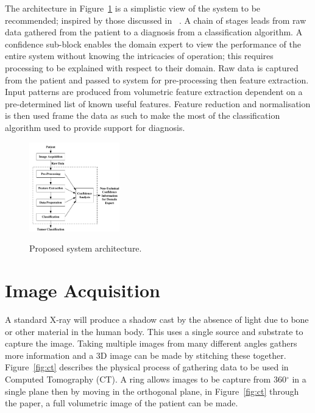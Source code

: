 \documentclass[journal]{IEEEtran}
\begin{document}
The architecture in Figure~\ref{fig:Proposed} is a simplistic view of the system to be recommended; inspired by those discussed in ~\cite{ahmed2011efficacy,kumar2011classification,sachdeva2011multiclass}.
A chain of stages leads from raw data gathered from the patient to a diagnosis from a classification algorithm.
A confidence sub-block enables the domain expert to view the performance of the entire system without knowing the intricacies of operation; this requires processing to be explained with respect to their domain.
Raw data is captured from the patient and passed to system for pre-processing then feature extraction.
Input patterns are produced from volumetric feature extraction dependent on a pre-determined list of known useful features. 
Feature reduction and normalisation is then used frame the data as such to make the most of the classification algorithm used to provide support for diagnosis.

\begin{figure}[!htb]
   \centering
   \includegraphics[width = 0.35\textwidth]{Figures/Proposed.pdf}
   \label{fig:Proposed}
   \caption{Proposed system architecture.}
\end{figure}











\section{Image Acquisition}
\label{sec:image}

A standard X-ray will produce a shadow cast by the absence of light due to bone or other material in the human body.
This uses a single source and substrate to capture the image.
Taking multiple images from many different angles gathers more information and a 3D image can be made by stitching these together.
Figure~\ref{fig:ct} describes the physical process of gathering data to be used in Computed Tomography (CT).
A ring allows images to be capture from 360$^{\circ}$ in a single plane then by moving in the orthogonal plane, in Figure~\ref{fig:ct} through the paper, a full volumetric image of the patient can be made. 
\end{document}
